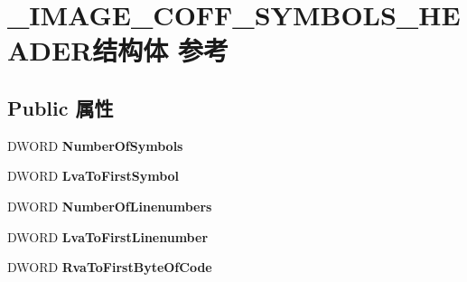 \hypertarget{struct___i_m_a_g_e___c_o_f_f___s_y_m_b_o_l_s___h_e_a_d_e_r}{}\section{\+\_\+\+I\+M\+A\+G\+E\+\_\+\+C\+O\+F\+F\+\_\+\+S\+Y\+M\+B\+O\+L\+S\+\_\+\+H\+E\+A\+D\+E\+R结构体 参考}
\label{struct___i_m_a_g_e___c_o_f_f___s_y_m_b_o_l_s___h_e_a_d_e_r}
\subsection*{Public 属性}
\begin{DoxyCompactItemize}
\item 
\mbox{\label{struct___i_m_a_g_e___c_o_f_f___s_y_m_b_o_l_s___h_e_a_d_e_r_af53138b0dee0c2f7feb5b7d78e0faa58}} 
D\+W\+O\+RD {\bfseries Number\+Of\+Symbols}
\item 
\mbox{\label{struct___i_m_a_g_e___c_o_f_f___s_y_m_b_o_l_s___h_e_a_d_e_r_a59e099cc50c949c609b458a546e79767}} 
D\+W\+O\+RD {\bfseries Lva\+To\+First\+Symbol}
\item 
\mbox{\label{struct___i_m_a_g_e___c_o_f_f___s_y_m_b_o_l_s___h_e_a_d_e_r_aef7bcf31be9909182b4c8adcab979641}} 
D\+W\+O\+RD {\bfseries Number\+Of\+Linenumbers}
\item 
\mbox{\label{struct___i_m_a_g_e___c_o_f_f___s_y_m_b_o_l_s___h_e_a_d_e_r_ac830f3715ad81233a87335ded94af9f1}} 
D\+W\+O\+RD {\bfseries Lva\+To\+First\+Linenumber}
\item 
\mbox{\label{struct___i_m_a_g_e___c_o_f_f___s_y_m_b_o_l_s___h_e_a_d_e_r_adb3cc134d16f35cff641cdaa08ec5da6}} 
D\+W\+O\+RD {\bfseries Rva\+To\+First\+Byte\+Of\+Code}
\item 
\mbox{\label{struct___i_m_a_g_e___c_o_f_f___s_y_m_b_o_l_s___h_e_a_d_e_r_a0088f50acdc82748de2a9f86128be80a}} 

\end{DoxyCompactItemize}
